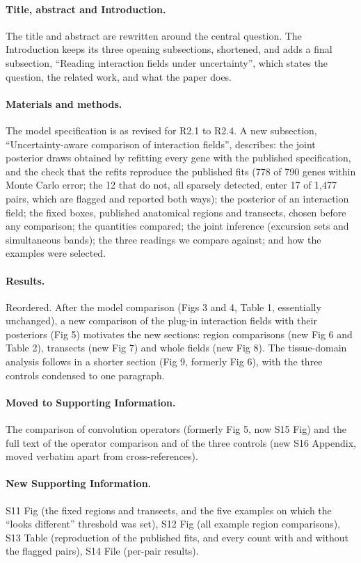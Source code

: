 \documentclass[11pt]{article}
\begin{document}
\paragraph{Title, abstract and Introduction.} The title and abstract are rewritten around the
central question. The Introduction keeps its three opening subsections, shortened, and adds a
final subsection, ``Reading interaction fields under uncertainty'', which states the question,
the related work, and what the paper does.

\paragraph{Materials and methods.} The model specification is as revised for R2.1 to R2.4. A new
subsection, ``Uncertainty-aware comparison of interaction fields'', describes: the joint posterior
draws obtained by refitting every gene with the published specification, and the check that the
refits reproduce the published fits (778 of 790 genes within Monte Carlo error; the 12 that do
not, all sparsely detected, enter 17 of 1,477 pairs, which are flagged and reported both ways);
the posterior of an interaction field; the fixed boxes, published anatomical regions and
transects, chosen before any comparison; the quantities compared; the joint inference (excursion
sets and simultaneous bands); the three readings we compare against; and how the examples were
selected.

\paragraph{Results.} Reordered. After the model comparison (Figs 3 and 4, Table 1, essentially
unchanged), a new comparison of the plug-in interaction fields with their posteriors (Fig 5) motivates the new sections: region comparisons (new Fig 6 and Table 2), transects
(new Fig 7) and whole fields (new Fig 8). The tissue-domain analysis follows in a shorter section
(Fig 9, formerly Fig 6), with the three controls condensed to one paragraph.

\paragraph{Moved to Supporting Information.} The comparison of convolution operators (formerly
Fig 5, now S15 Fig) and the full text of the operator comparison and of the three controls (new S16
Appendix, moved verbatim apart from cross-references).

\paragraph{New Supporting Information.} S11 Fig (the fixed regions and transects, and the five
examples on which the ``looks different'' threshold was set), S12 Fig (all example region
comparisons), S13 Table (reproduction of the published fits, and every count with and without the
flagged pairs), S14 File (per-pair results).
\end{document}

